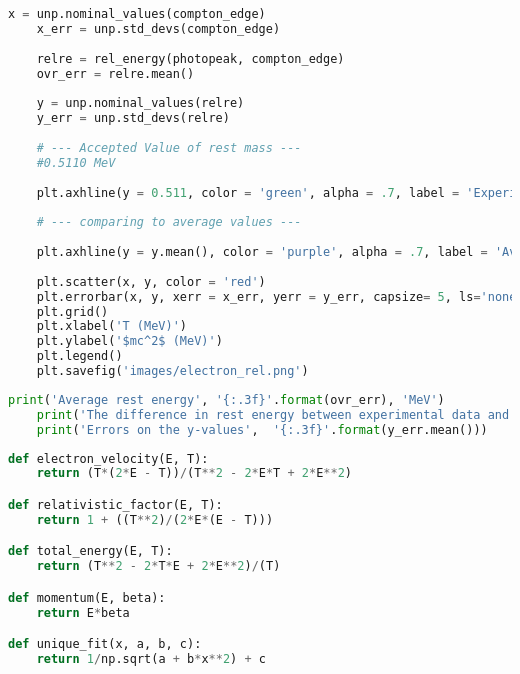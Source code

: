\begin{lstlisting}[language = Python, frame = single]
    x = unp.nominal_values(compton_edge)
    x_err = unp.std_devs(compton_edge)
    
    relre = rel_energy(photopeak, compton_edge)
    ovr_err = relre.mean()
    
    y = unp.nominal_values(relre)
    y_err = unp.std_devs(relre)
    
    # --- Accepted Value of rest mass --- 
    #0.5110 MeV
    
    plt.axhline(y = 0.511, color = 'green', alpha = .7, label = 'Experimentally Accepted Value')
    
    # --- comparing to average values --- 
    
    plt.axhline(y = y.mean(), color = 'purple', alpha = .7, label = 'Average Value of Data')
    
    plt.scatter(x, y, color = 'red')
    plt.errorbar(x, y, xerr = x_err, yerr = y_err, capsize= 5, ls='none', color = 'red')
    plt.grid()
    plt.xlabel('T (MeV)')
    plt.ylabel('$mc^2$ (MeV)')
    plt.legend()
    plt.savefig('images/electron_rel.png')
\end{lstlisting}

\begin{lstlisting}[language = Python, frame = single]
    print('Average rest energy', '{:.3f}'.format(ovr_err), 'MeV')
    print('The difference in rest energy between experimental data and the accepted value is', '{:.3f}'.format(y.mean() - 0.511), 'MeV, this is a differnce of', '{:.3f}'.format(0.511/y.mean()), '%')
    print('Errors on the y-values',  '{:.3f}'.format(y_err.mean()))
\end{lstlisting}

\begin{lstlisting}[language = Python, frame = single]
    def electron_velocity(E, T):
    return (T*(2*E - T))/(T**2 - 2*E*T + 2*E**2)

def relativistic_factor(E, T):
    return 1 + ((T**2)/(2*E*(E - T)))

def total_energy(E, T):
    return (T**2 - 2*T*E + 2*E**2)/(T)

def momentum(E, beta):
    return E*beta

def unique_fit(x, a, b, c):
    return 1/np.sqrt(a + b*x**2) + c
\end{lstlisting}

